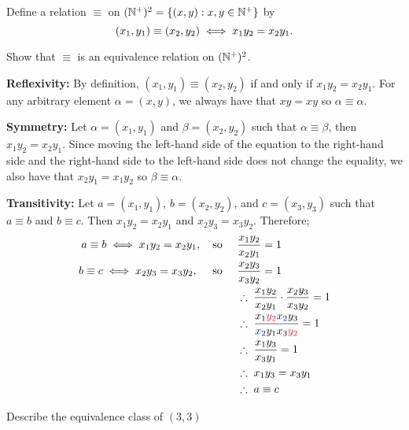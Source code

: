 \begin{problem}
  Define a relation $\equiv$ on $(\mathbb{N}^+)^2 = \left\{(x, y) : x, y \in \mathbb{N}^+\right\}$ by
  \[ (x_1, y_1) \equiv (x_2, y_2) \;\Longleftrightarrow\; x_1y_2 = x_2y_1. \]
  \begin{enumalph}
    \item Show that $\equiv$ is an equivalence relation on $(\mathbb{N}^+)^2$.
      \begin{Answer}
        \begin{enumroman}
          \item \textbf{Reflexivity:}
            By definition, $(x_1, y_1) \equiv (x_2, y_2)$ if and only if $x_1 y_2 = x_2y_1$.
            For any arbitrary element $\alpha = (x, y)$, we always have that $x y = x y$
            so $\alpha \equiv \alpha$.
          \item \textbf{Symmetry:}
            Let $\alpha = (x_1, y_1)$ and $\beta = (x_2, y_2)$
            such that $\alpha \equiv \beta$, then $x_1 y_2 = x_2 y_1$.
            Since moving the left-hand side of the equation to the right-hand side
            and the right-hand side to the left-hand side does not change the equality,
            we also have that $x_2 y_1 = x_1 y_2$ so $\beta \equiv \alpha$.
          \item \textbf{Transitivity:}
            Let $a = (x_1, y_1)$, $b = (x_2, y_2)$, and $c = (x_3, y_3)$
            such that $a \equiv b$ and $b \equiv c$.
            Then $x_1 y_2 = x_2 y_1$ and $x_2 y_3 = x_3 y_2$.
            Therefore;
            \begin{align*}
              a \equiv b \Iff x_1 y_2 = x_2 y_1, \quad \text{so } \quad &\frac{x_1 y_2}{x_2 y_1} = 1 \\
              b \equiv c \Iff x_2 y_3 = x_3 y_2, \quad \text{ so } \quad &\frac{x_2 y_3}{x_3 y_2} = 1 \\
              &\Therefore \frac{x_1 y_2}{x_2 y_1} \cdot \frac{x_2 y_3}{x_3 y_2} = 1 \\
              &\Therefore \frac{x_1 \crim{y_2} \zaff{x_2} y_3}{\zaff{x_2} y_1 x_3 \crim{y_2}} = 1\\
              &\Therefore \frac{x_1 y_3}{x_3 y_1} = 1 \\
              &\Therefore x_1 y_3 = x_3 y_1 \\
              &\Therefore a \equiv c
            \end{align*}
        \end{enumroman}
      \end{Answer}
    \newpage
    \item Describe the equivalence class of $(3, 3)$

\end{enumalph}
\end{problem}
